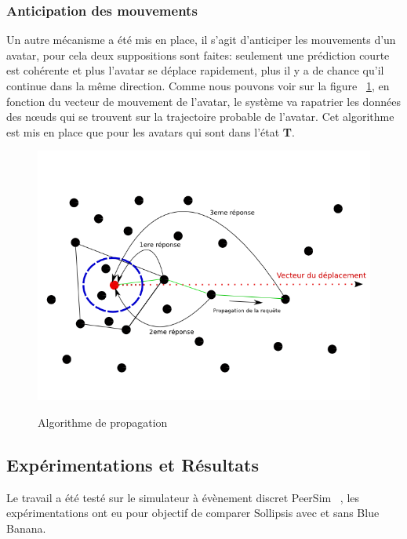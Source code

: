 	\subsubsection{Anticipation des mouvements}
	Un autre mécanisme a été mis en place, il s'agit d'anticiper les mouvements d'un avatar, pour cela deux suppositions sont faites: seulement une prédiction courte est cohérente et plus l'avatar se déplace rapidement, plus il y a de chance qu'il continue dans la même direction. Comme nous pouvons voir sur la figure ~\ref{Propa_Algo}, en fonction du vecteur de mouvement de l'avatar, le système va rapatrier les données des nœuds qui se trouvent sur la trajectoire probable de l'avatar. Cet algorithme est mis en place que pour les avatars qui sont dans l'état \textbf{T}.\\	
	\vspace{5mm}
        \begin{figure}[!h]
        \centering
        \includegraphics[scale=0.5]{../Images/propagation_algo.png}\\
        \caption{Algorithme de propagation}
        \label{Propa_Algo}
        \end{figure}
        \vspace{5mm}
	\subsection{Expérimentations et Résultats}
		Le travail a été testé sur le simulateur à évènement discret PeerSim ~\cite{peersim}, les expérimentations ont eu pour objectif de comparer Sollipsis avec et sans Blue Banana.

